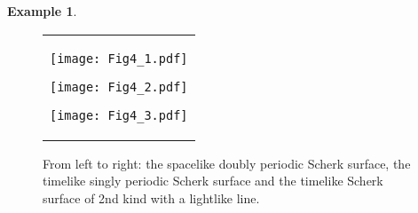 \documentclass[12pt,amstex]{amsart}%
\theoremstyle{plain} %
\theoremstyle{definition}
\newtheorem{example}[theorem]{Example}
\begin{document}
\begin{example}
\begin{figure}[!h]
\begin{center}
\begin{tabular}{c}

\hspace{-0.8cm}
\begin{minipage}{0.4\hsize}
\begin{center}
\vspace{-1.0cm}
\texttt{[image: Fig4\_1.pdf]}
\vspace{0.3cm}
\end{center}
\end{minipage}
\hspace{-1.0cm}
\begin{minipage}{0.4\hsize}
\begin{center}
\vspace{-0.8cm}
\texttt{[image: Fig4\_2.pdf]}
\vspace{0.5cm}
\end{center}
\end{minipage}

\hspace{-0.8cm}
\begin{minipage}{0.4\hsize}
\begin{center}
\vspace{-1.6cm}
\hspace{-1.0cm}
\texttt{[image: Fig4\_3.pdf]}
\end{center}
\end{minipage}
\end{tabular}
\end{center}
\vspace{-0.3cm}
\caption{From left to right: the spacelike doubly periodic Scherk surface, the timelike singly periodic Scherk surface and the timelike Scherk surface of 2nd kind with a lightlike line.}\label{Fig.5.4}

\end{figure}
\end{example}
\end{document}
